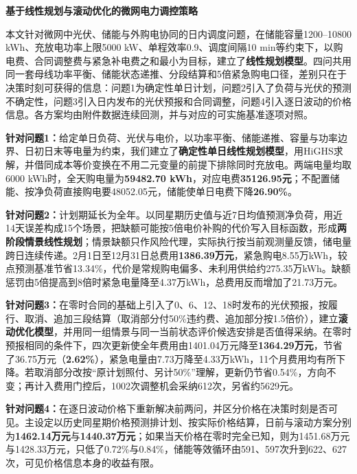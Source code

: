 \documentclass[UTF8,fontset=none,a4paper,zihao=-4]{ctexart}
\begin{document}
\begin{center}
{\bfseries 基于线性规划与滚动优化的微网电力调控策略}\par
{}
\end{center}
本文针对微网中光伏、储能与外购电协同的日内调度问题，在储能容量1200--10800 kWh、充放电功率上限5000 kW、单程效率0.9、调度间隔10 min等约束下，以购电费、合同调整费与紧急补电费之和最小为目标，建立了\textbf{线性规划模型}。四问共用同一套母线功率平衡、储能状态递推、分段结算和5倍紧急购电口径，差别只在于决策时刻可获得的信息：问题1为确定性单日计划，问题2引入了负荷与光伏的预测不确定性，问题3引入日内发布的光伏预报和合同调整，问题4引入逐日波动的价格信息。各方案均由附件数据连续回测，并与对应的可实施基准逐项对照。

\textbf{针对问题1：}给定单日负荷、光伏与电价，以功率平衡、储能递推、容量与功率边界、日初日末等电量为约束，我们建立了\textbf{确定性单日线性规划模型}，用HiGHS求解，并借同成本等价变换在不用二元变量的前提下排除同时充放电。两端电量均取6000 kWh时，全天购电量为\textbf{59482.70 kWh}，对应电费\textbf{35126.95元}；不配置储能、按净负荷直接购电要48052.05元，储能使单日电费下降\textbf{26.90\%}。

\textbf{针对问题2：}计划期延长为全年。以同星期历史值与近7日均值预测净负荷，用近14天误差构成15个场景，把缺额可能按5倍电价补购的代价写入目标函数，形成\textbf{两阶段情景线性规划}；情景缺额只作风险代理，实际执行按当前观测量反馈，储电量跨日连续传递。2月1日至12月31日总费用\textbf{1386.39万元}，紧急购电8.55万kWh，较点预测基准节省13.34\%，代价是常规购电偏多、未利用供给约275.35万kWh。缺额惩罚由5倍提高到8倍时紧急电量降至4.37万kWh，总费用反而增加了21.73万元。

\textbf{针对问题3：}在零时合同的基础上引入了0、6、12、18时发布的光伏预报，按履行、取消、追加三段结算（取消部分付50\%违约费、追加部分按1.5倍价），建立\textbf{滚动优化模型}，并用同一组情景与同一当前状态评价候选安排是否值得采纳。在零时预报相同的条件下，四次更新使全年费用由1401.04万元降至\textbf{1364.29万元}，节省了36.75万元（\textbf{2.62\%}），紧急电量由7.73万降至4.33万kWh，11个月费用均有所下降。若取消部分改按“原计划照付、另计50\%”理解，更新仍节省0.54\%，方向不变；再计入费用门控后，1002次调整机会采纳612次，另省约5629元。

\textbf{针对问题4：}在逐日波动价格下重新解决前两问，并区分价格在决策时刻是否可见。主设定以历史同星期价格预测排计划、按实际价格结算，日前与滚动方案分别为\textbf{1462.14万元}与\textbf{1440.37万元}；如果当天价格在零时完全已知，则为1451.68万元与1428.33万元，只低了0.72\%与0.84\%，储能等效循环由591、597次升到622、627次，可见价格信息本身的收益有限。
\end{document}
